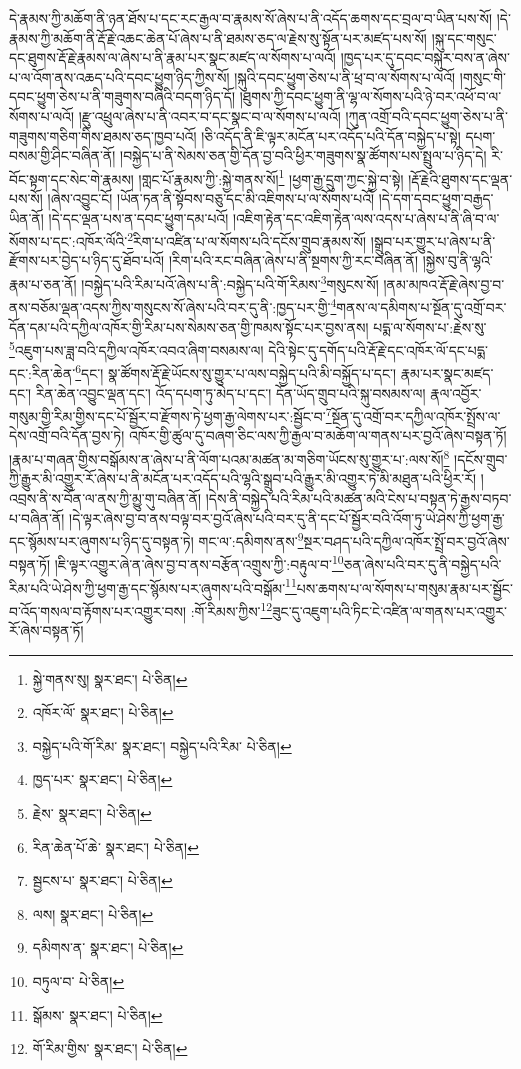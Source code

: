 དེ་རྣམས་ཀྱི་མཆོག་ནི་ཉན་ཐོས་པ་དང་རང་རྒྱལ་བ་རྣམས་སོ་ཞེས་པ་ནི་འདོད་ཆགས་དང་བྲལ་བ་ཡིན་པས་སོ། །དེ་རྣམས་ཀྱི་མཆོག་ནི་རྡོ་རྗེ་འཆང་ཆེན་པོ་ཞེས་པ་ནི་ཐམས་ཅད་ལ་རྗེས་སུ་སྟོན་པར་མཛད་པས་སོ། །སྐུ་དང་གསུང་དང་ཐུགས་རྡོ་རྗེ་རྣམས་ལ་ཞེས་པ་ནི་རྣམ་པར་སྣང་མཛད་ལ་སོགས་པ་ལའོ། །ཁྱད་པར་དུ་དབང་བསྐུར་བས་ན་ཞེས་པ་ལ་འོག་ནས་འཆད་པའི་དབང་ཕྱུག་ཉིད་ཀྱིས་སོ། །སྐུའི་དབང་ཕྱུག་ཅེས་པ་ནི་ཕྲ་བ་ལ་སོགས་པ་ལའོ། །གསུང་གི་དབང་ཕྱུག་ཅེས་པ་ནི་གཟུགས་བཞིའི་བདག་ཉིད་དོ། །ཐུགས་ཀྱི་དབང་ཕྱུག་ནི་ལྷ་ལ་སོགས་པའི་ཉེ་བར་འཕོ་བ་ལ་སོགས་པ་ལའོ། །རྫུ་འཕྲུལ་ཞེས་པ་ནི་འབར་བ་དང་སྣང་བ་ལ་སོགས་པ་ལའོ། །ཀུན་འགྲོ་བའི་དབང་ཕྱུག་ཅེས་པ་ནི་གཟུགས་གཅིག་གིས་ཐམས་ཅད་ཁྱབ་པའོ། །ཅི་འདོད་ནི་ཇི་ལྟར་མངོན་པར་འདོད་པའི་དོན་བསྐྱེད་པ་སྟེ། དཔག་བསམ་གྱི་ཤིང་བཞིན་ནོ། །བསྐྱེད་པ་ནི་སེམས་ཅན་གྱི་དོན་བྱ་བའི་ཕྱིར་གཟུགས་སྣ་ཚོགས་པས་སྤྲུལ་པ་ཉིད་དེ། རི་བོང་སྟག་དང་སེང་གེ་རྣམས། །གླང་པོ་རྣམས་ཀྱི་:སྐྱེ་གནས་སོ།\footnote{སྐྱེ་གནས་སུ།  སྣར་ཐང་།  པེ་ཅིན། } །ཕྱག་རྒྱ་དྲུག་ཀྱང་སྐྱེ་བ་སྟེ། །རྡོ་རྗེའི་ཐུགས་དང་ལྡན་པས་སོ། །ཞེས་འབྱུང་ངོ། །ཡོན་ཏན་ནི་སྟོབས་བཅུ་དང་མི་འཇིགས་པ་ལ་སོགས་པའོ། །དེ་དག་དབང་ཕྱུག་བརྒྱད་ཡིན་ནོ། །དེ་དང་ལྡན་པས་ན་དབང་ཕྱུག་དམ་པའོ། །འཇིག་རྟེན་དང་འཇིག་རྟེན་ལས་འདས་པ་ཞེས་པ་ནི་ཞི་བ་ལ་སོགས་པ་དང་:འཁོར་ལོའི་\footnote{འཁོར་ལོ་  སྣར་ཐང་།  པེ་ཅིན། }རིག་པ་འཛིན་པ་ལ་སོགས་པའི་དངོས་གྲུབ་རྣམས་སོ། །སྒྲུབ་པར་གྱུར་པ་ཞེས་པ་ནི་རྫོགས་པར་བྱེད་པ་ཉིད་དུ་ཐོབ་པའོ། །རིག་པའི་རང་བཞིན་ཞེས་པ་ནི་སྔགས་ཀྱི་རང་བཞིན་ནོ། །སྐྱེས་བུ་ནི་ལྷའི་རྣམ་པ་ཅན་ནོ། །བསྐྱེད་པའི་རིམ་པའོ་ཞེས་པ་ནི་:བསྐྱེད་པའི་གོ་རིམས་\footnote{བསྐྱེད་པའི་གོ་རིམ་  སྣར་ཐང་། བསྐྱེད་པའི་རིམ་  པེ་ཅིན། }གསུངས་སོ། །ནམ་མཁའ་རྡོ་རྗེ་ཞེས་བྱ་བ་ནས་བཅོམ་ལྡན་འདས་ཀྱིས་གསུངས་སོ་ཞེས་པའི་བར་དུ་ནི་:ཁྱད་པར་གྱི་\footnote{ཁྱད་པར་  སྣར་ཐང་།  པེ་ཅིན། }གནས་ལ་དམིགས་པ་སྔོན་དུ་འགྲོ་བར་དོན་དམ་པའི་དཀྱིལ་འཁོར་གྱི་རིམ་པས་སེམས་ཅན་གྱི་ཁམས་སྟོང་པར་བྱས་ནས། པདྨ་ལ་སོགས་པ་:རྗེས་སུ་\footnote{རྗེས་  སྣར་ཐང་།  པེ་ཅིན། }འཇུག་པས་ཟླ་བའི་དཀྱིལ་འཁོར་འབའ་ཞིག་བསམས་ལ། དེའི་སྟེང་དུ་དགོད་པའི་རྡོ་རྗེ་དང་འཁོར་ལོ་དང་པདྨ་དང་:རིན་ཆེན་\footnote{རིན་ཆེན་པོ་ཆེ་  སྣར་ཐང་།  པེ་ཅིན། }དང་། སྣ་ཚོགས་རྡོ་རྗེ་ཡོངས་སུ་གྱུར་པ་ལས་བསྐྱེད་པའི་མི་བསྐྱོད་པ་དང་། རྣམ་པར་སྣང་མཛད་དང་། རིན་ཆེན་འབྱུང་ལྡན་དང་། འོད་དཔག་ཏུ་མེད་པ་དང་། དོན་ཡོད་གྲུབ་པའི་སྐུ་བསམས་ལ། རྣལ་འབྱོར་གསུམ་གྱི་རིམ་གྱིས་དང་པོ་སྦྱོར་བ་རྫོགས་ཏེ་ཕྱག་རྒྱ་ལེགས་པར་:སྦྱོང་བ་\footnote{སྦྱངས་པ་  སྣར་ཐང་།  པེ་ཅིན། }སྔོན་དུ་འགྲོ་བར་དཀྱིལ་འཁོར་སྤྲོས་ལ་དེས་འགྲོ་བའི་དོན་བྱས་ཏེ། འཁོར་གྱི་ཚུལ་དུ་བཞག་ཅིང་ལས་ཀྱི་རྒྱལ་བ་མཆོག་ལ་གནས་པར་བྱའོ་ཞེས་བསྟན་ཏོ། །རྣམ་པ་གཞན་གྱིས་བསྒོམས་ན་ཞེས་པ་ནི་ལོག་པའམ་མཚན་མ་གཅིག་ཡོངས་སུ་གྱུར་པ་:ལས་སོ།\footnote{ལས།  སྣར་ཐང་།  པེ་ཅིན། } །དངོས་གྲུབ་ཀྱི་རྒྱུར་མི་འགྱུར་རོ་ཞེས་པ་ནི་མངོན་པར་འདོད་པའི་ལྷའི་སྒྲུབ་པའི་རྒྱུར་མི་འགྱུར་ཏེ་མི་མཐུན་པའི་ཕྱིར་རོ། །འབྲས་ནི་ས་བོན་ལ་ནས་ཀྱི་མྱུ་གུ་བཞིན་ནོ། །དེས་ནི་བསྐྱེད་པའི་རིམ་པའི་མཚན་མའི་ངེས་པ་བསྟན་ཏེ་རྒྱས་བཏབ་པ་བཞིན་ནོ། །དེ་ལྟར་ཞེས་བྱ་བ་ནས་བལྟ་བར་བྱའོ་ཞེས་པའི་བར་དུ་ནི་དང་པོ་སྦྱོར་བའི་འོག་ཏུ་ཡེ་ཤེས་ཀྱི་ཕྱག་རྒྱ་དང་སྙོམས་པར་ཞུགས་པ་ཉིད་དུ་བསྟན་ཏེ། གང་ལ་:དམིགས་ནས་\footnote{དམིགས་ན་  སྣར་ཐང་།  པེ་ཅིན། }སྔར་བཤད་པའི་དཀྱིལ་འཁོར་སྤྲོ་བར་བྱའོ་ཞེས་བསྟན་ཏོ། །ཇི་ལྟར་འགྱུར་ཞེ་ན་ཞེས་བྱ་བ་ནས་བརྩོན་འགྲུས་ཀྱི་:བརྟུལ་བ་\footnote{བཏུལ་བ་  པེ་ཅིན། }ཅན་ཞེས་པའི་བར་དུ་ནི་བསྐྱེད་པའི་རིམ་པའི་ཡེ་ཤེས་ཀྱི་ཕྱག་རྒྱ་དང་སྙོམས་པར་ཞུགས་པའི་བསྒོམ་\footnote{སྒོམས་  སྣར་ཐང་།  པེ་ཅིན། }པས་ཆགས་པ་ལ་སོགས་པ་གསུམ་རྣམ་པར་སྦྱོང་བ་འོད་གསལ་བ་རྟོགས་པར་འགྱུར་བས། :གོ་རིམས་ཀྱིས་\footnote{གོ་རིམ་གྱིས་  སྣར་ཐང་།  པེ་ཅིན། }ཟུང་དུ་འཇུག་པའི་ཏིང་ངེ་འཛིན་ལ་གནས་པར་འགྱུར་རོ་ཞེས་བསྟན་ཏོ། 